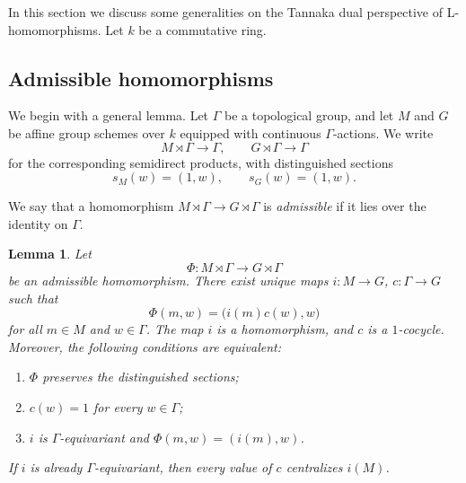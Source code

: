 \documentclass[reqno]{amsart}
\numberwithin{equation}{subsection}
\newcommand{\co}{\colon}
\newtheorem{lemma}[thm]{Lemma}
\theoremstyle{remark}
\numberwithin{equation}{subsection}
\numberwithin{figure}{subsection}
\begin{document}
In this section we discuss some generalities on the Tannaka dual perspective of L-homomorphisms. Let $k$ be a commutative ring. 

\subsection{Admissible homomorphisms}
\label{sssec:split-extensions-and-cocycles}

We begin with a general lemma.  Let $\Gamma$ be a topological group, and let
$M$ and $G$ be affine group schemes over $k$ equipped with continuous
$\Gamma$-actions.  We write
\[
M\rtimes\Gamma \longrightarrow \Gamma,
\qquad
G\rtimes\Gamma \longrightarrow \Gamma
\]
for the corresponding semidirect products, with distinguished sections
\[
s_M(w)=(1,w),\qquad s_G(w)=(1,w).
\]

We say that a homomorphism $M \rtimes \Gamma \rightarrow G \rtimes \Gamma$ is \emph{admissible} if it lies over the identity on $\Gamma$. 

\begin{lemma}\label{lem:homomorphisms-of-split-extensions}
Let
\[
\Phi\co M\rtimes\Gamma\longrightarrow G\rtimes\Gamma
\]
be an admissible homomorphism. There exist unique maps $i\co M \to G$, $c\co \Gamma \to G$ such that
\begin{equation}\label{eq:general-cocycle-formula}
\Phi(m,w)=\bigl(i(m)c(w),w\bigr)
\end{equation}
for all $m \in M$ and $w \in \Gamma$. The map $i$ is a homomorphism, and $c$ is a $1$-cocycle.
Moreover, the following conditions are equivalent:
\begin{enumerate}[label=(\roman*)]
\item $\Phi$ preserves the distinguished sections;
\item $c(w)=1$ for every $w\in\Gamma$;
\item $i$ is $\Gamma$-equivariant and
    $\Phi(m,w)=(i(m),w)$.
\end{enumerate}
If $i$ is already $\Gamma$-equivariant, then every value of $c$ centralizes
$i(M)$.
\end{lemma}
\end{document}
